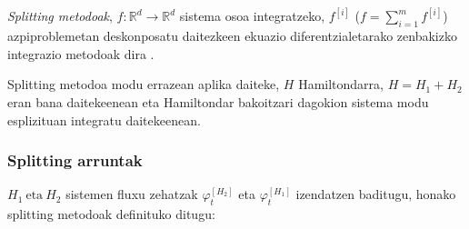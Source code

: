 \emph{Splitting metodoak}, $f: \mathbb{R}^d \rightarrow \mathbb{R}^d$ sistema osoa integratzeko, $f^{[i]}$ ($f=\sum\limits_{i=1}^{m} f^{[i]}$) azpiproblemetan deskonposatu daitezkeen ekuazio diferentzialetarako zenbakizko integrazio metodoak dira \cite{SSerna2015b,Hairer2006}.

Splitting metodoa modu errazean aplika daiteke, $H$ Hamiltondarra, $H=H_1+H_2$ eran bana daitekeenean eta Hamiltondar bakoitzari dagokion sistema modu esplizituan integratu daitekeenean.  

\subsubsection*{Splitting arruntak}

$H_1 \ \text{eta} \ H_2$ sistemen fluxu zehatzak $\varphi_t^{[H_2]}$ eta $\varphi_t^{[H_1]}$ izendatzen baditugu, honako splitting metodoak definituko ditugu:

